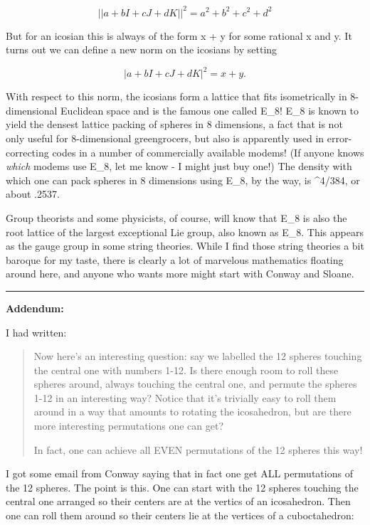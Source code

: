 $$
          ||a + bI + cJ + dK||^{2} = a^{2} + b^{2} + c^{2} + d^{2} 
$$
    

But for an icosian this is always of the form x +  y for some
rational x and y.  It turns out we can define a new norm on the icosians
by setting

$$
          |a + bI + cJ + dK|^{2} = x + y.
$$
    


 With respect to this norm, the icosians form a lattice that fits
isometrically in 8-dimensional Euclidean space and is the famous one
called E_{8}!  E_{8} is known to yield the densest
lattice packing of spheres in 8 dimensions, a fact that is not only
useful for 8-dimensional greengrocers, but also is apparently used in
error-correcting codes in a number of commercially available modems!
(If anyone knows \emph{which} modems use E_{8}, let me know -
I might just buy one!)  The density with which one can pack spheres in 8
dimensions using E_{8}, by the way, is \pi ^{4}/384, 
or about .2537.

Group theorists and some physicists, of course, will know that
E_{8} is also the root lattice of the largest exceptional Lie
group, also known as E_{8}.  This appears as the gauge group in
some string theories.  While I find those string theories a bit baroque
for my taste, there is clearly a lot of marvelous mathematics floating
around here, and anyone who wants more might start with Conway and
Sloane.

\par\noindent\rule{\textwidth}{0.4pt}
\textbf{Addendum:} 

I had written:
\begin{quote}
Now here's an interesting question: say we labelled the 12 spheres
touching the central one with numbers 1-12.  Is there enough room to
roll these spheres around, always touching the central one, and permute
the spheres 1-12 in an interesting way?  Notice that it's trivially easy
to roll them around in a way that amounts to rotating the icosahedron,
but are there more interesting permutations one can get?

In fact, one can achieve all EVEN permutations of the 12 spheres this
way! 
\end{quote}
    

I got some email from Conway saying that in fact one get ALL permutations of 
the 12 spheres.  The point is this.  One can start with the 12 spheres
touching the central one arranged so their centers are at the vertics
of an icosahedron.  Then one can roll them around so their centers lie
at the vertices of a cuboctahedron:

